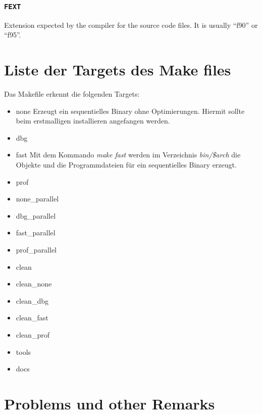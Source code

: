\documentclass[a4paper,10pt]{report}
\newcommand{\mytt}[1]{{\tt #1}}
\begin{document}
\subsection{\mytt{FEXT}}
Extension expected by the compiler for the source code files. It is
usually ``f90'' or ``f95''.


\chapter{Liste der Targets des Make files}

Das Makefile erkennt die folgenden Targets:
\begin{itemize}
\item {none} Erzeugt ein sequentielles Binary ohne Optimierungen.
Hiermit sollte beim erstmalligen installieren angefangen werden.
\item {dbg}
\item {fast} Mit dem Kommando \textit{make fast} werden im Verzeichnis\textit{
bin/\$arch} die Objekte und die Programmdateien für ein sequentielles
Binary erzeugt.

\item {prof}
\item {none\_parallel}
\item {dbg\_parallel}
\item {fast\_parallel}
\item {prof\_parallel}
\item  {clean}
\item {clean\_none}
\item {clean\_dbg}
\item {clean\_fast}
\item {clean\_prof}
\item {tools}
\item {docs}
\end{itemize}



\chapter{Problems und other Remarks}
\end{document}
